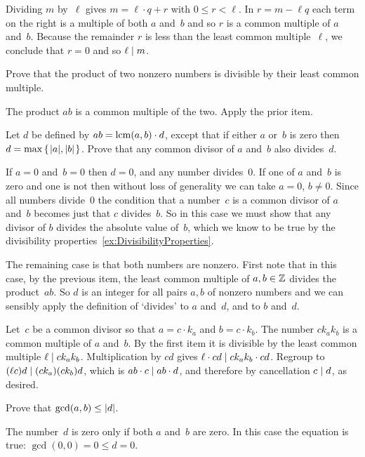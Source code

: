 \documentclass{ibl}  %
\begin{document}
\begin{euclidproof}
\begin{problem}
\begin{exes}
\begin{answer}
  Dividing $m$ by~$\ell$ gives 
  $m=\ell\cdot q+r$ with $0\leq r< \ell$.
  In $r=m-\ell q$ 
  each term on the right is a multiple
  of both $a$ and~$b$ and so 
  $r$ is a common multiple of $a$ and~$b$.
  Because the remainder $r$ is less than the least common multiple~$\ell$,
  we conclude that $r=0$ and so $\ell\mid m$.  
\end{answer}
\begin{exercise} 
  Prove that the product of two nonzero numbers is divisible by their 
  least common multiple.
\end{exercise}
\begin{answer}
  The product $ab$ is a common multiple of the two.
  Apply the prior item.
\end{answer}
\begin{exercise} 
  Let $d$ be defined by 
  $ab=\operatorname{lcm}(a,b)\cdot d$, except that if either $a$ or~$b$ is zero
  then $d=\max\mbox{$\{\hspace{0.1em}\lvert a\rvert,\lvert b\rvert\hspace{0.1em}\}$}$.
  Prove that any common divisor of $a$ and~$b$ also divides~$d$.
\end{exercise}
\begin{answer}
  If $a=0$ and~$b=0$ then $d=0$, and any number divides~$0$.
  If one of $a$ and~$b$ is zero and one is not then without loss of generality
  we can take $a=0$, $b\neq 0$.
  Since all numbers divide~$0$ the condition that a number~$c$ 
  is a common divisor of $a$ and~$b$
  becomes just that $c$ divides~$b$.
  So in this case we must show that any divisor of $b$ divides the 
  absolute value of~$b$, which we know to be true by the divisibility 
  properties~\ref{ex:DivisibilityProperties}.

  The remaining case is that both numbers are nonzero.
  First note that in this case,
  by the previous item, the least common multiple of $a,b\in\mathbb{Z}$ divides
  the product~$ab$.
  So $d$ is an integer for all pairs $a,b$ of nonzero numbers
  and we can sensibly apply the definition of `divides' to
  $a$ and~$d$, and to $b$ and~$d$.
  
  Let~$c$ be a common divisor so that $a=c\cdot k_a$ and $b=c\cdot k_b$.
  The number $ck_ak_b$ is a common multiple of $a$ and~$b$. 
  By the first item it is divisible by the least common multiple  
  $\ell\mid ck_ak_b$.
  Multiplication by $cd$ gives $\ell\cdot cd\mid ck_ak_b\cdot cd$.
  Regroup to $(\ell c)d\mid (ck_a)(ck_b)d$, which is
  $ab\cdot c\mid ab\cdot d$, and therefore by cancellation $c\mid d$,
  as desired.  
\end{answer}
\begin{exercise} 
  Prove that $\gcd(a,b)\leq\lvert d\rvert$.
\end{exercise}
\begin{answer}
  The number~$d$ is zero only if both $a$ and~$b$ are
  zero.
  In this case the equation is true: $\gcd(0,0)=0\leq d=0$.


\end{answer}
\end{exes}
\end{problem}
\end{euclidproof}
\end{document}
